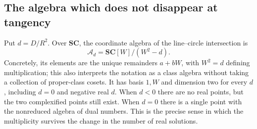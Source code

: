 \documentclass[11pt,letterpaper]{article}
\theoremstyle{definition}
\theoremstyle{remark}
\newcommand{\SC}{\mathbf{SC}}
\numberwithin{equation}{section}
\begin{document}
\subsection{The algebra which does not disappear at tangency}
Put $d=D/R^2$. Over $\SC$, the coordinate algebra of the line--circle intersection is
\begin{equation}\label{eq:quadalgebra}
 \mathcal A_d=\SC[W]/(W^2-d).
\end{equation}
Concretely, its elements are the unique remainders $a+bW$, with $W^2=d$ defining multiplication; this also interprets the notation as a class algebra without taking a collection of proper-class cosets. It has basis $1,W$ and dimension two for every $d$, including $d=0$ and negative real $d$. When $d<0$ there are no real points, but the two complexified points still exist. When $d=0$ there is a single point with the nonreduced algebra of dual numbers. This is the precise sense in which the multiplicity survives the change in the number of real solutions.
\end{document}
